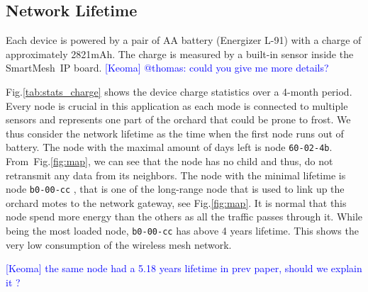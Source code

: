 \documentclass{sig-alternate}
\newcommand{\keoma}[1]       {\textcolor{blue}{[Keoma] #1}}
\newcommand{\smip}                     {SmartMesh~IP\xspace}
\begin{document}
\subsection{Network Lifetime}
\label{sec:charge}


Each device is powered by a pair of AA battery (Energizer L-91) with a charge of approximately 2821mAh.
The charge is measured by a built-in sensor inside the \smip board. \keoma{@thomas: could you give me more details?}


Fig.\ref{tab:stats_charge} shows the device charge statistics over a 4-month period.
Every node is crucial in this application as each mode is connected to multiple sensors and represents one part of the orchard that could be prone to frost.
We thus consider the network lifetime as the time when the first node runs out of battery.
The node with the maximal amount of days left is node {\tt 60-02-4b}.
From~Fig.\ref{fig:map}, we can see that the node has no child and thus, do not retransmit any data from its neighbors.
The node with the minimal lifetime is node {\tt b0-00-cc} , that is one of the long-range node that is used to link up the orchard motes to the network gateway, see Fig.\ref{fig:map}.
It is normal that this node spend more energy than the others as all the traffic passes through it.
While being the most loaded node, {\tt b0-00-cc} has above 4 years lifetime.
This shows the very low consumption of the wireless mesh network.

\keoma{the same node had a 5.18 years lifetime in prev paper, should we explain it ?}
\end{document}
